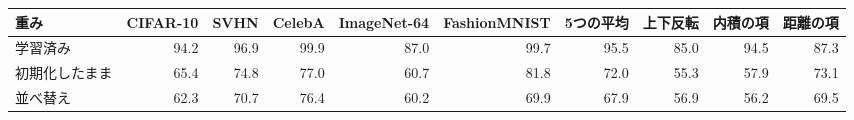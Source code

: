 \documentclass[border=3pt]{standalone}
\begin{document}
%
\begin{tabular}{l*{5}{r}rrrr}%
\toprule
重み & CIFAR-10 & SVHN & CelebA & ImageNet-64 & FashionMNIST & 5つの平均 & 上下反転 & 内積の項 & 距離の項\\
\midrule
学習済み & 94.2 & 96.9 & 99.9 & 87.0 & 99.7 & 95.5 & 85.0 & 94.5 & 87.3\\
初期化したまま & 65.4 & 74.8 & 77.0 & 60.7 & 81.8 & 72.0 & 55.3 & 57.9 & 73.1\\
並べ替え & 62.3 & 70.7 & 76.4 & 60.2 & 69.9 & 67.9 & 56.9 & 56.2 & 69.5\\
\bottomrule
\end{tabular}%
\end{document}
